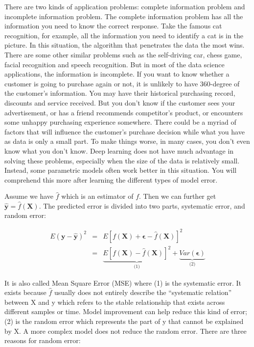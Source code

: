 \documentclass[
  12pt,
]{krantz}
\begin{document}
There are two kinds of application problems: complete information problem and incomplete information problem. The complete information problem has all the information you need to know the correct response. Take the famous cat recognition, for example, all the information you need to identify a cat is in the picture. In this situation, the algorithm that penetrates the data the most wins. There are some other similar problems such as the self-driving car, chess game, facial recognition and speech recognition. But in most of the data science applications, the information is incomplete. If you want to know whether a customer is going to purchase again or not, it is unlikely to have 360-degree of the customer's information. You may have their historical purchasing record, discounts and service received. But you don't know if the customer sees your advertisement, or has a friend recommends competitor's product, or encounters some unhappy purchasing experience somewhere. There could be a myriad of factors that will influence the customer's purchase decision while what you have as data is only a small part. To make things worse, in many cases, you don't even know what you don't know. Deep learning does not have much advantage in solving these problems, especially when the size of the data is relatively small. Instead, some parametric models often work better in this situation. You will comprehend this more after learning the different types of model error.

Assume we have \(\hat{f}\) which is an estimator of \(f\). Then we can further get \(\mathbf{\hat{y}}=\hat{f}(\mathbf{X})\). The predicted error is divided into two parts, systematic error, and random error:

\begin{equation}
\begin{array}{ccc}
E(\mathbf{y}-\hat{\mathbf{y}})^{2} & = & E[f(\mathbf{X})+ \mathbf{\epsilon} - \hat{f}(\mathbf{X})]^{2}\\
 & = & \underset{\text{(1)}}{\underbrace{E[f(\mathbf{X})-\hat{f}(\mathbf{X})]^{2}}}+\underset{\text{(2)}}{\underbrace{Var(\mathbf{\epsilon})}}
\end{array}
\label{eq:error}
\end{equation}

It is also called Mean Square Error (MSE) where (1) is the systematic error. It exists because \(\hat{f}\) usually does not entirely describe the ``systematic relation'' between X and y which refers to the stable relationship that exists across different samples or time. Model improvement can help reduce this kind of error; (2) is the random error which represents the part of y that cannot be explained by X. A more complex model does not reduce the random error. There are three reasons for random error:
\end{document}
